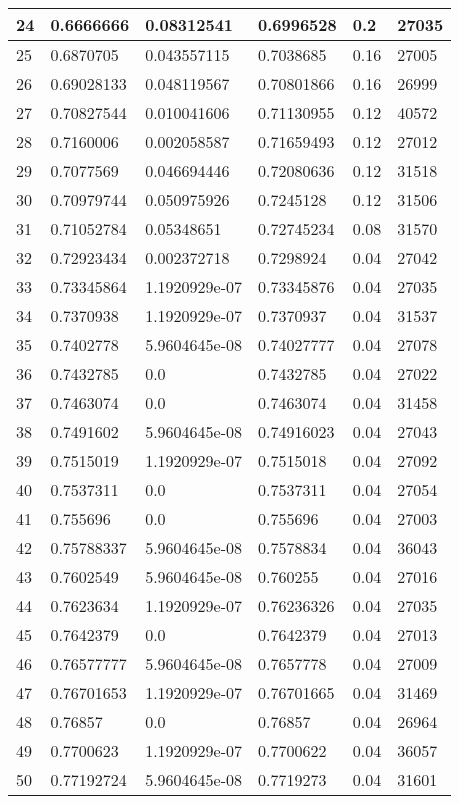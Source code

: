 \begin{longtable}{|l|l|l|l|l|l|}
24 & 0.6666666 & 0.08312541 & 0.6996528 & 0.2 & 27035 \\ \hline 
25 & 0.6870705 & 0.043557115 & 0.7038685 & 0.16 & 27005 \\ \hline 
26 & 0.69028133 & 0.048119567 & 0.70801866 & 0.16 & 26999 \\ \hline 
27 & 0.70827544 & 0.010041606 & 0.71130955 & 0.12 & 40572 \\ \hline 
28 & 0.7160006 & 0.002058587 & 0.71659493 & 0.12 & 27012 \\ \hline 
29 & 0.7077569 & 0.046694446 & 0.72080636 & 0.12 & 31518 \\ \hline 
30 & 0.70979744 & 0.050975926 & 0.7245128 & 0.12 & 31506 \\ \hline 
31 & 0.71052784 & 0.05348651 & 0.72745234 & 0.08 & 31570 \\ \hline 
32 & 0.72923434 & 0.002372718 & 0.7298924 & 0.04 & 27042 \\ \hline 
33 & 0.73345864 & 1.1920929e-07 & 0.73345876 & 0.04 & 27035 \\ \hline 
34 & 0.7370938 & 1.1920929e-07 & 0.7370937 & 0.04 & 31537 \\ \hline 
35 & 0.7402778 & 5.9604645e-08 & 0.74027777 & 0.04 & 27078 \\ \hline 
36 & 0.7432785 & 0.0 & 0.7432785 & 0.04 & 27022 \\ \hline 
37 & 0.7463074 & 0.0 & 0.7463074 & 0.04 & 31458 \\ \hline 
38 & 0.7491602 & 5.9604645e-08 & 0.74916023 & 0.04 & 27043 \\ \hline 
39 & 0.7515019 & 1.1920929e-07 & 0.7515018 & 0.04 & 27092 \\ \hline 
40 & 0.7537311 & 0.0 & 0.7537311 & 0.04 & 27054 \\ \hline 
41 & 0.755696 & 0.0 & 0.755696 & 0.04 & 27003 \\ \hline 
42 & 0.75788337 & 5.9604645e-08 & 0.7578834 & 0.04 & 36043 \\ \hline 
43 & 0.7602549 & 5.9604645e-08 & 0.760255 & 0.04 & 27016 \\ \hline 
44 & 0.7623634 & 1.1920929e-07 & 0.76236326 & 0.04 & 27035 \\ \hline 
45 & 0.7642379 & 0.0 & 0.7642379 & 0.04 & 27013 \\ \hline 
46 & 0.76577777 & 5.9604645e-08 & 0.7657778 & 0.04 & 27009 \\ \hline 
47 & 0.76701653 & 1.1920929e-07 & 0.76701665 & 0.04 & 31469 \\ \hline 
48 & 0.76857 & 0.0 & 0.76857 & 0.04 & 26964 \\ \hline 
49 & 0.7700623 & 1.1920929e-07 & 0.7700622 & 0.04 & 36057 \\ \hline 
50 & 0.77192724 & 5.9604645e-08 & 0.7719273 & 0.04 & 31601 \\ \hline 
\end{longtable}